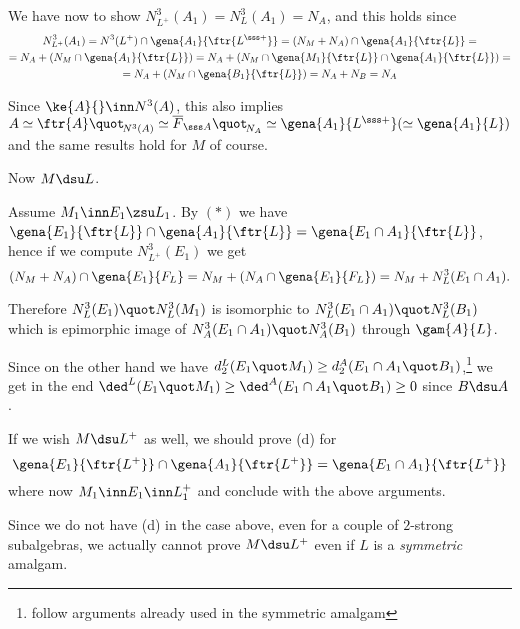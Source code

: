 \documentclass[a4paper,11pt,german,english]{article}
\begin{document}
We have now to show $N^{3}_{L^{+}}(A_{1})=N^{3}_{L}(A_{1})=N_{A}$, and this holds since
\begin{multline*}
N^{3}_{L^{+}}(A_{1})=
N^{3}(L^{+})
\cap\gena{A_{1}}{\ftr{ L^{\sss +} } }=(N_{M}+N_{A})\cap\gena{A_{1}}{\ftr{ L}}=\\
=N_{A}+( N_{M} \cap \gena{A_{1}}{\ftr{ L}} )
=N_{A}+( N_{M}\cap\gena{M_{1}}{\ftr{L}} \cap \gena{A_{1}}{\ftr{ L}} )=\\
=N_{A}+( N_{M}\cap\gena{B_{1}}{\ftr{L}})=N_{A}+N_{B}=N_{A}
\end{multline*}

Since $\ke{A}{}\inn N^{3}(A)$, this also implies $A\simeq\ftr{A}\quot_{\!N^{3}(A)} \simeq\overline{F}_{\sss A}\quot_{\!N_{A}}\simeq\gena{A_{1}}{L^{\sss +}}(\simeq\gena{A_{1}}{L})$ and the same results hold for $M$ of course.

\bigskip\noindent
Now $M\dsu L$.

\smallskip
Assume $M_{1}\inn E_{1}\zsu L_{1}$.
By $(\ast)$ we have $\gena{E_{1}}{\ftr{L}}\cap\gena{A_{1}}{\ftr{L}}=\gena{E_{1}\cap A_{1}}{\ftr{L}}$, hence if
we compute $N^{3}_{L^{+}}(E_{1})$ we get
$$
(N_{M}+N_{A})\cap\gena{E_{1}}{F_{L}}=N_{M}+(N_{A}\cap
\gena{E_{1}}{F_{L}})=N_{M}+N_{L}^{3}(E_{1}\cap A_{1}).
$$

Therefore $N^{3}_{L}(E_{1})\quot N^{3}_{L}(M_{1})$ is isomorphic to
$N^{3}_{L}(E_{1}\cap A_{1})\quot N^{3}_{L}(B_{1})$ which is epimorphic image
of  $N^{3}_{A}(E_{1}\cap A_{1})\quot N^{3}_{A}(B_{1})$ through $\gam{A}{L}$.

\medskip
Since on the other hand we have $d_{2}^{L}(E_{1}\quot M_{1})\geq d_{2}^{A}(E_{1}\cap
A_{1}\quot B_{1})$,\footnote{follow arguments already used in the symmetric amalgam}
we get in the end $\ded^{L}(E_{1}\quot M_{1})\geq\ded^{A}(E_{1}\cap A_{1}\quot
B_{1})\geq0$ since $B\dsu A$.

\bigskip
If we wish $M\dsu L^{+}$ as well, we should prove (d) for
$$\gena{E_{1}}{\ftr{L^{+}}}\cap\gena{A_{1}}{\ftr{L^{+}}}=\gena{E_{1}\cap A_{1}}{\ftr{L^{+}}}$$
where now $M_{1}\inn E_{1}\inn L_{1}^{+}$ and conclude with the above arguments.

Since we do not have (d) in the case above, even for a couple of $2$-strong subalgebras,
we actually cannot prove $M\dsu L^{+}$ even if $L$ is a {\em symmetric} amalgam.
\end{document}

